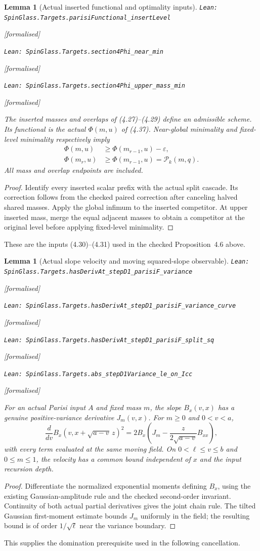 \documentclass[11pt]{article}
\providecommand{\lean}[1]{\leavevmode\par\nopagebreak
  {\noindent\normalfont\footnotesize\raggedright\texttt{Lean: #1}\par}\nopagebreak}
\providecommand{\leanok}{\par\nopagebreak
  {\noindent\normalfont\footnotesize\textcolor{green!50!black}{[formalised]}\par}\nopagebreak}
\newtheorem{lemma}[theorem]{Lemma}
\begin{document}
\begin{lemma}[Actual inserted functional and optimality inputs]
\lean{SpinGlass.Targets.parisiFunctional\_insertLevel}\leanok
\lean{SpinGlass.Targets.section4Phi\_near\_min}\leanok
\lean{SpinGlass.Targets.section4Phi\_upper\_mass\_min}\leanok
The inserted masses and overlaps of (4.27)--(4.29) define an admissible scheme.
Its functional is the actual $\Phi(m,u)$ of (4.37). Near-global minimality and
fixed-level minimality respectively imply
\[
 \begin{aligned}
 \Phi(m,u)&\ge\Phi(m_{r-1},u)-\varepsilon,\\
 \Phi(m_r,u)&\ge\Phi(m_{r-1},u)=\mathcal P_k(m,q).
 \end{aligned}
\]
All mass and overlap endpoints are included.
\end{lemma}
\begin{proof}
Identify every inserted scalar prefix with the actual split cascade. Its
correction follows from the checked paired correction after canceling halved
shared masses. Apply the global infimum to the inserted competitor. At upper
inserted mass, merge the equal adjacent masses to obtain a competitor at the
original level before applying fixed-level minimality.
\end{proof}
These are the inputs (4.30)--(4.31) used in the checked Proposition~4.6 above.

\begin{lemma}[Actual slope velocity and moving squared-slope observable]
\lean{SpinGlass.Targets.hasDerivAt\_stepD1\_parisiF\_variance}\leanok
\lean{SpinGlass.Targets.hasDerivAt\_stepD1\_parisiF\_variance\_curve}\leanok
\lean{SpinGlass.Targets.hasDerivAt\_stepD1\_parisiF\_split\_sq}\leanok
\lean{SpinGlass.Targets.abs\_stepD1Variance\_le\_on\_Icc}\leanok
For an actual Parisi input $A$ and fixed mass $m$, the slope
$B_x(v,x)$ has a genuine positive-variance derivative $J_m(v,x)$.
For $m\ge0$ and $0<v<a$,
\[
 \frac d{dv} B_x(v,x+\sqrt{a-v}\,z)^2
 =2B_x\left(J_m-\frac{z}{2\sqrt{a-v}}B_{xx}\right),
\]
with every term evaluated at the same moving field.
On $0<\ell\le v\le b$ and $0\le m\le1$, the velocity has a common bound
independent of $x$ and the input recursion depth.
\end{lemma}
\begin{proof}
Differentiate the normalized exponential moments defining $B_x$, using
the existing Gaussian-amplitude rule and the checked second-order invariant.
Continuity of both actual partial derivatives gives the joint chain rule.
The tilted Gaussian first-moment estimate bounds $J_m$ uniformly in the field;
the resulting bound is of order $1/\sqrt\ell$ near the variance boundary.
\end{proof}
This supplies the domination prerequisite used in the following cancellation.
\end{document}
